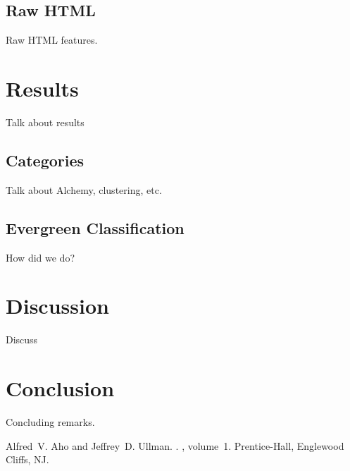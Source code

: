 \documentclass[11pt]{article}
\begin{document}
\subsection{Raw HTML}
\label{ssect:rawhtml}
Raw HTML features.


\section{Results}
\label{sect:results}
Talk about results


\subsection{Categories}
\label{sect:categories}
Talk about Alchemy, clustering, etc.


\subsection{Evergreen Classification}
\label{sect:evergreenclassification}
How did we do?


\section{Discussion}
\label{sect:discussion}
Discuss

\section{Conclusion}
\label{sect:conclusion}
Concluding remarks.





%
%

\begin{thebibliography}{}

Alfred~V. Aho and Jeffrey~D. Ullman.
.
, volume~1.
\newblock Prentice-{Hall}, Englewood Cliffs, NJ.

\end{thebibliography}
\end{document}
